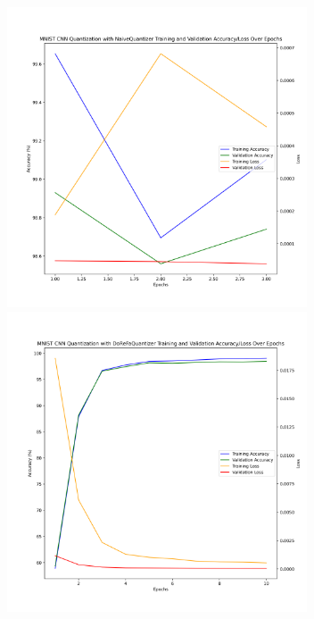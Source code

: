 \documentclass{article}
\begin{document}
\begin{figure}
    \centerline{\includegraphics[width=3.5in]{../proj2/figures/mnist_cnn_NaiveQuantizer.png}\includegraphics[width=3.5in]{../proj2/figures/mnist_cnn_DoReFaQuantizer.png}}

\end{figure}
\end{document}
